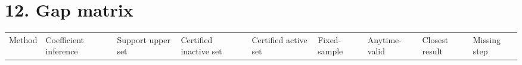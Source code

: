 \documentclass[
  english,
  11pt,
  a4paper,
]{article}
\newcounter{none} %
\begin{document}
\section{12. Gap matrix}\label{gap-matrix}

{\def\LTcaptype{none} %
\begin{landscape}
\scriptsize
\begin{longtable}[]{@{}
  >{\raggedright\arraybackslash}p{}
  >{\raggedright\arraybackslash}p{}
  >{\raggedright\arraybackslash}p{}
  >{\raggedright\arraybackslash}p{}
  >{\raggedright\arraybackslash}p{}
  >{\raggedright\arraybackslash}p{}
  >{\raggedright\arraybackslash}p{}
  >{\raggedright\arraybackslash}p{}
  >{\raggedright\arraybackslash}p{}@{}}
\toprule\noalign{}
\begin{minipage}[b]{\linewidth}\raggedright
Method
\end{minipage} & \begin{minipage}[b]{\linewidth}\raggedright
Coefficient inference
\end{minipage} & \begin{minipage}[b]{\linewidth}\raggedright
Support upper set
\end{minipage} & \begin{minipage}[b]{\linewidth}\raggedright
Certified inactive set
\end{minipage} & \begin{minipage}[b]{\linewidth}\raggedright
Certified active set
\end{minipage} & \begin{minipage}[b]{\linewidth}\raggedright
Fixed-sample
\end{minipage} & \begin{minipage}[b]{\linewidth}\raggedright
Anytime-valid
\end{minipage} & \begin{minipage}[b]{\linewidth}\raggedright
Closest result
\end{minipage} & \begin{minipage}[b]{\linewidth}\raggedright
Missing step
\end{minipage} \\

\end{longtable}
\end{landscape}}
\end{document}

